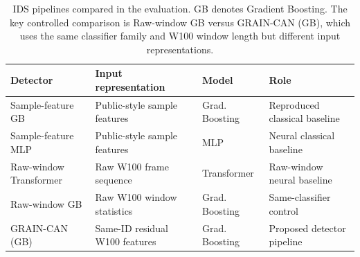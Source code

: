 \documentclass[runningheads]{llncs}
\begin{document}
\begin{table}[!htbp]
\centering
\caption{IDS pipelines compared in the evaluation. GB denotes Gradient Boosting. The key controlled comparison is Raw-window GB versus GRAIN-CAN (GB), which uses the same classifier family and W100 window length but different input representations.}
\label{tab:pipelines}
\small
\setlength{\tabcolsep}{5pt}
\renewcommand{\arraystretch}{1.06}
\begin{tabularx}{\textwidth}{p{} X p{} p{}}
\toprule
Detector & Input representation & Model & Role \\
\midrule
Sample-feature GB & Public-style sample features & Grad. Boosting & Reproduced classical baseline \\
Sample-feature MLP & Public-style sample features & MLP & Neural classical baseline \\
Raw-window Transformer & Raw W100 frame sequence & Transformer & Raw-window neural baseline \\
Raw-window GB & Raw W100 window statistics & Grad. Boosting & Same-classifier control \\
GRAIN-CAN (GB) & Same-ID residual W100 features & Grad. Boosting & Proposed detector pipeline \\
\bottomrule
\end{tabularx}
\end{table}
\end{document}
